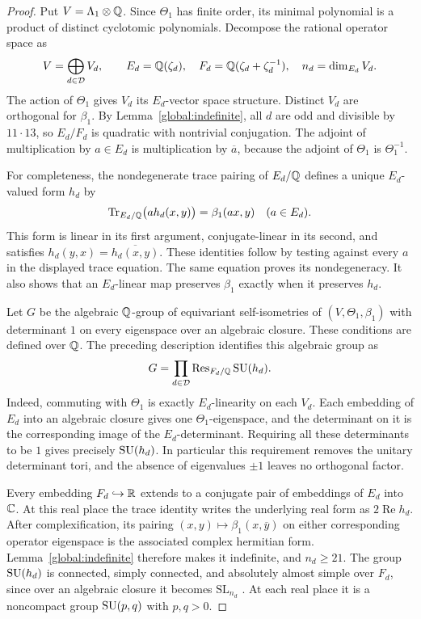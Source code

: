\begin{proof}
Put $V=\Lambda_1\otimes\mathbb Q$.  Since $\Theta_1$ has finite order,
its minimal polynomial is a product of distinct cyclotomic
polynomials.  Decompose the rational operator space as
\[
 V=\bigoplus_{d\in\mathcal D}V_d,
 \qquad
 E_d=\mathbb Q(\zeta_d),\quad F_d=\mathbb Q(\zeta_d+\zeta_d^{-1}),
 \quad n_d=\dim_{E_d}V_d.
\]
The action of $\Theta_1$ gives $V_d$ its $E_d$-vector space
structure.  Distinct $V_d$ are orthogonal for $\beta_1$.
By Lemma~\ref{global:indefinite}, all $d$ are odd and divisible
by $11\cdot13$, so $E_d/F_d$ is quadratic with nontrivial
conjugation.  The adjoint of multiplication by $a\in E_d$ is
multiplication by $\overline a$, because the adjoint of $\Theta_1$
is $\Theta_1^{-1}$.

For completeness, the nondegenerate trace pairing of $E_d/\mathbb Q$
defines a unique $E_d$-valued form $h_d$ by
\[
 \operatorname{Tr}_{E_d/\mathbb Q}\bigl(a h_d(x,y)\bigr)=\beta_1(ax,y)
 \quad(a\in E_d).
\]
This form is linear in its first argument, conjugate-linear in
its second, and satisfies $h_d(y,x)=\overline{h_d(x,y)}$.
These identities follow by testing against every $a$ in the
displayed trace equation.  The same equation proves its
nondegeneracy.  It also shows that an $E_d$-linear map preserves
$\beta_1$ exactly when it preserves $h_d$.

Let $G$ be the algebraic $\mathbb Q$-group of equivariant self-isometries of
$(V,\Theta_1,\beta_1)$ with determinant $1$ on every eigenspace
over an algebraic closure.  These conditions are defined over
$\mathbb Q$.  The preceding description identifies this algebraic group as
\begin{equation}
\label{global:unitary-group}
 G=\prod_{d\in\mathcal D}\operatorname{Res}_{F_d/\mathbb Q}\operatorname{SU}(h_d).
\end{equation}
Indeed, commuting with $\Theta_1$ is exactly $E_d$-linearity on
each $V_d$.  Each embedding of $E_d$ into an algebraic closure
gives one $\Theta_1$-eigenspace, and the determinant on it is
the corresponding image of the $E_d$-determinant.  Requiring
all these determinants to be $1$ gives precisely $\operatorname{SU}(h_d)$.
In particular this requirement removes the unitary determinant
tori, and the absence of eigenvalues $\pm1$ leaves no
orthogonal factor.

Every embedding $F_d\hookrightarrow\mathbb R$ extends to a conjugate
pair of embeddings of $E_d$ into $\mathbb C$.  At this real place the trace
identity writes the underlying real form as $2\operatorname{Re}h_d$.
After complexification, its pairing $(x,y)\mapsto\beta_1(x,\overline y)$
on either corresponding operator eigenspace is the associated complex
hermitian form.  Lemma~\ref{global:indefinite} therefore makes it
indefinite, and $n_d\ge21$.
The group $\operatorname{SU}(h_d)$ is connected, simply connected, and
absolutely almost simple over $F_d$, since over an algebraic
closure it becomes $\mathrm{SL}_{n_d}$
\cite[Theorem~24.44, Remark~24.46, and Summary~24.66]{Milne2022}.  At each real place it
is a noncompact group $\operatorname{SU}(p,q)$ with $p,q>0$.


\end{proof}

